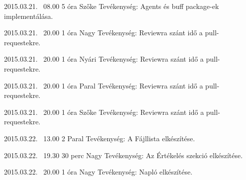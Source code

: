 \begin{naplo}
	\bejegyzes
	{2015.03.21. ~08.00}
	{5 óra}
	{Szőke} 
	{Tevékenység: Agents és buff package-ek implementálása.\newline }

    \bejegyzes
	{2015.03.21. ~20.00}
	{1 óra}
	{Nagy} 
	{Tevékenység: Reviewra szánt idő a pull-requestekre.\newline } 
	
    \bejegyzes
    {2015.03.21. ~20.00}
    {1 óra}
    {Nyári} 
    {Tevékenység: Reviewra szánt idő a pull-requestekre.\newline } 

    \bejegyzes
    {2015.03.21. ~20.00}
    {1 óra}
    {Paral} 
    {Tevékenység: Reviewra szánt idő a pull-requestekre.\newline } 

    \bejegyzes
    {2015.03.21. ~20.00}
    {1 óra}
    {Szőke} 
    {Tevékenység: Reviewra szánt idő a pull-requestekre.\newline } 
    
    \bejegyzes
    {2015.03.22. ~13.00}
    {2}
    {Paral} 
    {Tevékenység: A Fájllista elkészítése.\newline }     

	\bejegyzes
	{2015.03.22. ~19.30}
	{30 perc}
	{Nagy} 
	{Tevékenység: Az Értékelés szekció elkészítése.\newline } 
			
	\bejegyzes
	{2015.03.22. ~20.00}
	{1 óra}
	{Nagy} 
	{Tevékenység: Napló elkészítése.\newline } 
	
\end{naplo}




